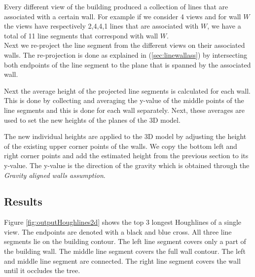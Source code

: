 	Every different view of the building produced a collection of lines that are
	associated with a certain wall. For example if we consider 4 views and for
	wall $W$ the views have respectively 2,4,4,1 lines that are associated with
	$W$, we have a total of 11 line segments that correspond with wall $W$.\\

	Next we re-project the line segment from the different views on their
	associated walls.  The re-projection is done as explained in
	(\ref{sec:linewallass}) by intersecting both endpoints
	of the line segment to the plane that is spanned by the associated wall.

	\clearpage

	Next the average height of the projected line segments is calculated for
	each wall. This is done by collecting and averaging the y-value of
	the middle points of the line segments and this is done for each wall separately.
	Next, these averages are
	used to set the new heights of the planes of the 3D model.  

	The new individual heights are applied to the 3D model by adjusting the
	height of the existing upper corner points of the walls. We copy the bottom
	left and right corner points and add the estimated height from the previous
	section to its y-value. The y-value is the direction of the gravity which is
	obtained through the \emph{Gravity aligned walls assumption}.\\

\newpage
\subsection{Results}
\label{sec:ResultImprove}

\clearpage
{}
\clearpage

Figure \ref{fig:outputHoughlines2d} shows the top 3 longest Houghlines of a
single view. The endpoints are denoted with a black and blue cross. All three line segments lie on the
building contour.  The left line segment covers only a part of the building wall. The
middle line segment covers the full wall contour. The left and middle line segment are connected. The
right line segment covers the wall until it occludes the tree.\\

